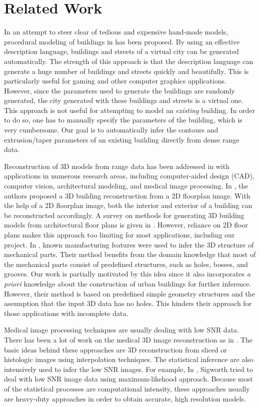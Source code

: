 \section{Related Work}

In an attempt to steer clear of tedious and expensive hand-made models,
procedural modeling of buildings in \cite{PMB_MWH,PMB_WWS,PMB_PM} has been proposed.
By using an effective description language, buildings and streets of a virtual
city can be generated automatically.
The strength of this approach is that the description language can generate
a huge number of buildings and streets quickly and beautifully.
This is particularly useful for gaming and other computer graphics applications.
However, since the parameters used to generate the buildings are randomly
generated, the city generated with these buildings and streets is a virtual one.
This approach is not useful for attempting to model an {\it existing} building.
In order to do so, one has to manually specify the parameters of the building,
which is very cumbersome.
Our goal is to automatically infer the contours and extrusion/taper parameters
of an existing building directly from dense range data.

Reconstruction of 3D models from range data has been addressed in
\cite{RE_Fisher,RE_CLF,RE_CD} with applications in numerous research areas,
including computer-aided design (CAD), computer vision, architectural modeling,
and medical image processing.
In \cite{DP_OWYC}, the authors proposed a 3D building reconstruction from a
2D floorplan image.
With the help of a 2D floorplan image, both the interior and exterior of a
building can be reconstructed accordingly.
A survey on methods for generating 3D building models from architectural
floor plans is given in \cite{YIN09}.
However, reliance on 2D floor plans makes this approach too limiting for
most applications, including our project.
In \cite{RE_TOGSH}, known manufacturing features were used to infer the
3D structure of mechanical parts.
Their method benefits from the domain knowledge that most of the mechanical
parts consist of predefined structures, such as holes, bosses, and grooves.
Our work is partially motivated by this idea since it also incorporates
{\it a priori} knowledge about the construction of urban buildings for further
inference.
However, their method is based on predefined simple geometry structures and
the assumption that the input 3D data has no holes.
This hinders their approach for those applications with incomplete data.

Medical image processing techniques are usually dealing with low SNR data.
There has been a lot of work on the medical 3D image reconstruction as in
\cite{MIR_FJS, MIR_BMMNB, MIR_KL, MIR_SKJ, MIR_SMHC, MIR_BVC}.
The basic ideas behind these approaches
are 3D reconstruction from sliced or histologic images using interpolation techniques.
The statistical inference are also intensively used to infer the low SNR images. For example,
In \cite{MIR_FJS}, Sigworth tried to deal with low SNR image data using maximum-likehood approach.
Because most of the statistical processes are computational intensity,
these approaches usually are heavy-duty approaches in order to obtain accurate, high resolution models.

